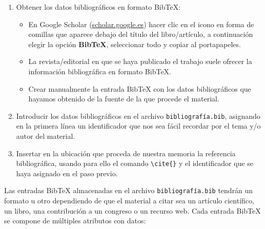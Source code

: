 \begin{enumerate}
    \item Obtener los datos bibliográficos en formato BibTeX:
    \begin{itemize}
        \item En Google Scholar (\url{scholar.google.es}) hacer clic en el icono en forma de comillas que aparece debajo del título del libro/artículo, a continuación elegir la opción \textbf{BibTeX}, seleccionar todo y copiar al portapapeles.
        
        \item La revista/editorial en que se haya publicado el trabajo suele ofrecer la información bibliográfica en formato BibTeX.
        
        \item Crear manualmente la entrada BibTeX con los datos bibliográficos que hayamos obtenido de la fuente de la que procede el material.
    \end{itemize}
    
    \item Introducir los datos bibliográficos en el archivo \texttt{bibliografía.bib}, asignando en la primera línea un identificador que nos sea fácil recordar por el tema y/o autor del material.
    
    \item Insertar en la ubicación que proceda de nuestra memoria la referencia bibliográfica, usando para ello el comando \verb|\cite{}| y el identificador que se haya asignado en el paso previo.
\end{enumerate}

Las entradas BibTeX almacenadas en el archivo \texttt{bibliografía.bib} tendrán un formato u otro dependiendo de que el material a citar sea un artículo científico, un libro, una contribución a un congreso o un recurso web. Cada entrada BibTeX se compone de múltiples atributos con datos:

